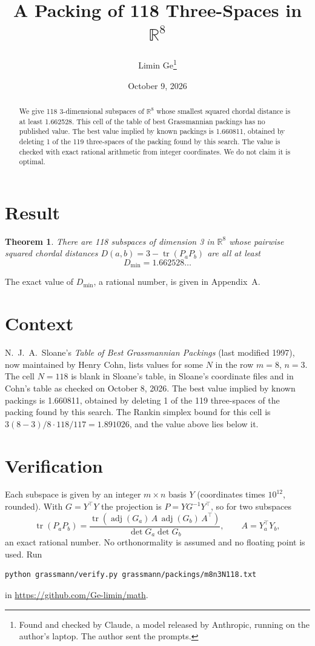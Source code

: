 \documentclass[11pt,a4paper]{article}
\title{A Packing of 118 Three-Spaces in $\mathbb{R}^{8}$}
\author{Limin Ge\thanks{Found and checked by Claude, a model released by Anthropic, running on the author's laptop. The author sent the prompts.}}
\date{October 9, 2026}
\newtheorem*{theorem}{Theorem}
\begin{document}
\maketitle
\begin{abstract}
We give 118 3-dimensional subspaces of $\mathbb{R}^{8}$ whose smallest squared chordal distance is at least 1.662528. This cell of the table of best Grassmannian packings has no published value. The best value implied by known packings is 1.660811, obtained by deleting 1 of the 119 three-spaces of the packing found by this search. The value is checked with exact rational arithmetic from integer coordinates. We do not claim it is optimal.
\end{abstract}

\section{Result}
\begin{theorem}
There are 118 subspaces of dimension 3 in $\mathbb{R}^{8}$ whose pairwise squared chordal distances $D(a,b) = 3 - \operatorname{tr}(P_aP_b)$ are all at least
\[ D_{\min} = 1.662528\ldots \]
\end{theorem}
The exact value of $D_{\min}$, a rational number, is given in Appendix~A.


\section{Context}
N.~J.~A.~Sloane's \emph{Table of Best Grassmannian Packings} (last modified 1997), now maintained by Henry Cohn, lists values for some $N$ in the row $m=8$, $n=3$. The cell $N=118$ is blank in Sloane's table, in Sloane's coordinate files and in Cohn's table as checked on October 8, 2026. The best value implied by known packings is 1.660811, obtained by deleting 1 of the 119 three-spaces of the packing found by this search. The Rankin simplex bound for this cell is $3(8-3)/8\cdot 118/117 = 1.891026$, and the value above lies below it.


\section{Verification}
Each subspace is given by an integer $m\times n$ basis $Y$ (coordinates times $10^{12}$, rounded). With $G=Y^\top Y$ the projection is $P=YG^{-1}Y^\top$, so for two subspaces
\[ \operatorname{tr}(P_aP_b)=\frac{\operatorname{tr}(\operatorname{adj}(G_a)\,A\,\operatorname{adj}(G_b)\,A^\top)}{\det G_a\det G_b},\qquad A=Y_a^\top Y_b, \]
an exact rational number. No orthonormality is assumed and no floating point is used. Run
\begin{verbatim}
python grassmann/verify.py grassmann/packings/m8n3N118.txt
\end{verbatim}
in \url{https://github.com/Ge-limin/math}.
\end{document}

